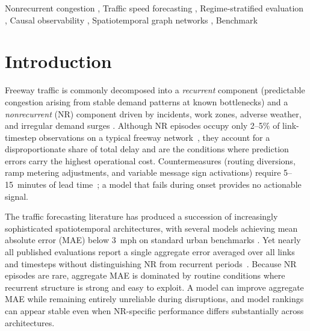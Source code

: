\documentclass[a4paper]{cas-sc}
\begin{document}
\begin{keywords}
Nonrecurrent congestion \sep
Traffic speed forecasting \sep
Regime-stratified evaluation \sep
Causal observability \sep
Spatiotemporal graph networks \sep
Benchmark
\end{keywords}

\maketitle

\linenumbers

\section{Introduction}
\label{sec:introduction}

Freeway traffic is commonly decomposed into a \emph{recurrent} component
(predictable congestion arising from stable demand patterns at known
bottlenecks) and a \emph{nonrecurrent} (NR) component driven by
incidents, work zones, adverse weather, and irregular demand surges
\citep{skabardonis2003, schrank2021, fhwa2025}.
Although NR episodes occupy only 2--5\% of link-timestep observations
on a typical freeway network~\citep{bae2026labeling}, they account for
a disproportionate share of total delay and are the conditions where
prediction errors carry the highest operational cost.
Countermeasures (routing diversions, ramp metering adjustments, and
variable message sign activations) require 5--15~minutes of lead time~\citep{fhwa2025, williams2007tmcsurvey};
a model that fails during onset provides no actionable signal.

The traffic forecasting literature has produced a succession of increasingly
sophisticated spatiotemporal architectures, with several models achieving
mean absolute error (MAE) below 3~mph on standard urban benchmarks
\citep{li2018dcrnn, wu2019gwnet, liu2024largest, shaygan2022survey}.
Yet nearly all published evaluations report a single aggregate error
averaged over all links and timesteps without distinguishing NR from
recurrent periods~\citep{bae2026why}.
Because NR episodes are rare, aggregate MAE is dominated by routine
conditions where recurrent structure is strong and easy to exploit.
A model can improve aggregate MAE while remaining entirely unreliable
during disruptions, and model rankings can appear stable even when
NR-specific performance differs substantially across architectures.
\end{document}
